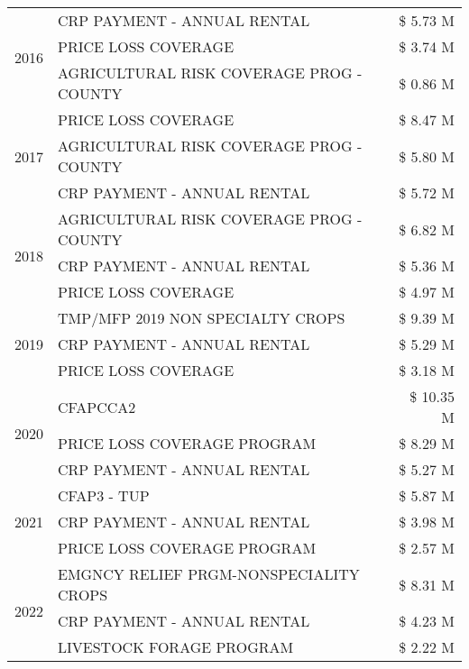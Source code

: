 \begin{tabular}{llr}
\cline{1-3}
\multirow[t]{3}{*}{2016} & CRP PAYMENT - ANNUAL RENTAL & \$ 5.73 M \\
 & PRICE LOSS COVERAGE & \$ 3.74 M \\
 & AGRICULTURAL RISK COVERAGE PROG - COUNTY & \$ 0.86 M \\
\cline{1-3}
\multirow[t]{3}{*}{2017} & PRICE LOSS COVERAGE & \$ 8.47 M \\
 & AGRICULTURAL RISK COVERAGE PROG - COUNTY & \$ 5.80 M \\
 & CRP PAYMENT - ANNUAL RENTAL & \$ 5.72 M \\
\cline{1-3}
\multirow[t]{3}{*}{2018} & AGRICULTURAL RISK COVERAGE PROG - COUNTY & \$ 6.82 M \\
 & CRP PAYMENT - ANNUAL RENTAL & \$ 5.36 M \\
 & PRICE LOSS COVERAGE & \$ 4.97 M \\
\cline{1-3}
\multirow[t]{3}{*}{2019} & TMP/MFP 2019 NON SPECIALTY CROPS & \$ 9.39 M \\
 & CRP PAYMENT - ANNUAL RENTAL & \$ 5.29 M \\
 & PRICE LOSS COVERAGE & \$ 3.18 M \\
\cline{1-3}
\multirow[t]{3}{*}{2020} & CFAPCCA2 & \$ 10.35 M \\
 & PRICE LOSS COVERAGE PROGRAM & \$ 8.29 M \\
 & CRP PAYMENT - ANNUAL RENTAL & \$ 5.27 M \\
\cline{1-3}
\multirow[t]{3}{*}{2021} & CFAP3 - TUP & \$ 5.87 M \\
 & CRP PAYMENT - ANNUAL RENTAL & \$ 3.98 M \\
 & PRICE LOSS COVERAGE PROGRAM & \$ 2.57 M \\
\cline{1-3}
\multirow[t]{3}{*}{2022} & EMGNCY RELIEF PRGM-NONSPECIALITY CROPS & \$ 8.31 M \\
 & CRP PAYMENT - ANNUAL RENTAL & \$ 4.23 M \\
 & LIVESTOCK FORAGE PROGRAM & \$ 2.22 M \\
\cline{1-3}
\bottomrule
\end{tabular}
